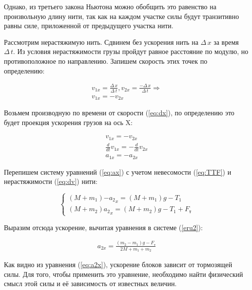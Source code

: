 Однако, из третьего закона Ньютона можно обобщить это равенство на произвольную длину нити, так как на каждом участке силы будут транзитивно равны силе, приложенной от предыдущего участка нити.

Рассмотрим нерастяжимую нить. Сдвинем без ускорения нить на $\Delta\,x$ за время $\Delta\,t$. Из условия нерастяжимости грузы пройдут равное расстояние по модулю, но противоположное по направлению. Запишем скорость этих точек по определению: 

\begin{gather}
	\label{eq:dx}
	v_{1x}=\frac{\Delta\,x}{\Delta\,t},	v_{2x}=\frac{-\Delta\,x}{\Delta\,t}\Rightarrow\\
	v_{1x}=-v_{2x}
\end{gather}

Возьмем производную по времени от скорости (\ref{eq:dx}), по определению это будет проекция ускорения грузов на ось X:

\begin{gather}
	v_{1x}=-v_{2x}\\
	\frac{d}{dt}{v_{1x}}=-\frac{d}{dt}{v_{2x}}\\
	a_{1x}=-a_{2x}\label{eq:dv}
\end{gather}

Перепишем систему уравнений (\ref{eq:ax}) с учетом невесомости (\ref{eq:TTF}) и нерастяжимости (\ref{eq:dv}) нити:

\begin{equation}
\begin{cases}
	(M+m_1){-{a_2}_x}=(M+m_1){g}-{T_1}\\
	(M+m_2){{a_2}_x}=(M+m_2){g}-{T_1+F_\text{т}}\label{eru2}
 \end{cases}
\end{equation}

Выразим отсюда ускорение, вычитая уравнения в системе (\ref{eru2}):

\begin{gather}
	\label{eq:a2x}
	a_{2x}=\frac{(m_2-m_1)g-F_\text{т}}{2M+m_1+m_2}
\end{gather}

Как видно из уравнения (\ref{eq:a2x}), ускорение блоков зависит от тормозящей силы. Для того, чтобы применить это уравнение, необходимо найти физический смысл этой силы и её зависимость от известных величин.



